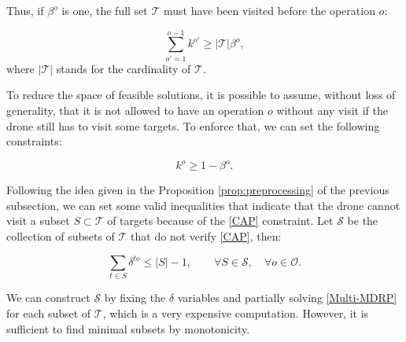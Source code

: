 \documentclass{itor}
\theoremstyle{definition}
\theoremstyle{remark}
\begin{document}
Thus, if $\beta^o$ is one, the full set $\mathcal T$ must have been visited before the operation $o$:

\begin{equation}\tag{VI-1}\label{eq:VI-1}
\sum_{o'=1}^{o-1} k^{o'} \geq |\mathcal T|\beta^o,
\end{equation}
where $|\mathcal T|$ stands for the cardinality of $\mathcal T$.

To reduce the space of feasible solutions, it is possible to assume, without loss of generality, that it is not allowed to have an operation $o$ without any visit if the drone still has to visit some targets. To enforce that, we can set the following constraints:

\begin{equation}\tag{VI-2}\label{eq:VI-2}
k^o \geq 1 - \beta^o.
\end{equation}

Following the idea given in the Proposition \ref{prop:preprocessing} of the previous subsection, we can set some valid inequalities that indicate that the drone cannot visit a subset $S\subset\mathcal{T}$ of targets because of the \eqref{CAP} constraint. Let $\mathcal S$ be the collection of subsets of $\mathcal T$ that do not verify \eqref{CAP}, then:

\begin{equation}\tag{VI-3}\label{eq:VI-3}
\sum_{t\in S} \delta^{to} \leq |S| - 1, \qquad\forall S\in \mathcal S, \quad\forall o\in\mathcal O.
\end{equation}

We can construct $\mathcal S$ by fixing the $\delta$ variables and partially solving \eqref{Multi-MDRP} for each subset of $\mathcal T$, which is a very expensive computation. However, it is sufficient to find minimal subsets by monotonicity.

\end{document}
